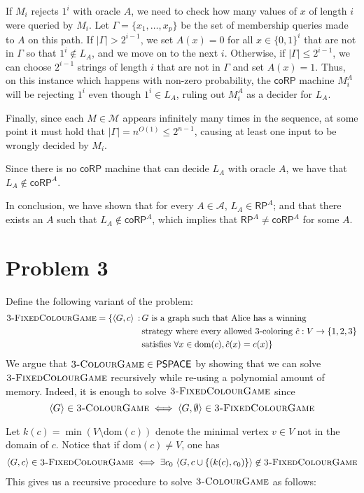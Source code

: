\documentclass{article}
\newcommand{\game}[0]{\textsc{3-ColourGame}}
\newcommand{\variantgame}[0]{\textsc{3-FixedColourGame}}
\newcommand{\PSPACE}[0]{\mathsf{PSPACE}}
\begin{document}
If $M_i$ rejects $1^i$ with oracle $A$, we need to check how many values of $x$ of length $i$ were queried by $M_i$. Let $\Gamma = \{x_1, \ldots, x_p\}$ be the set of membership queries made to $A$ on this path. If $|\Gamma| > 2^{i-1}$, we set $A(x) = 0$ for all $x \in \{0, 1\}^i$ that are not in $\Gamma$ so that $1^i \notin L_A$, and we move on to the next $i$. Otherwise, if $|\Gamma| \leq 2^{i-1}$, we can choose $2^{i-1}$ strings of length $i$ that are not in $\Gamma$ and set $A(x) = 1$. Thus, on this instance which happens with non-zero probability, the $\mathsf{coRP}$ machine $M_i^A$ will be rejecting $1^i$ even though $1^i \in L_A$, ruling out $M_i^A$ as a decider for $L_A$.

Finally, since each $M \in \mathcal{M}$ appears infinitely many times in the sequence, at some point it must hold that $|\Gamma| = n^{O(1)} \leq 2^{n-1}$, causing at least one input to be wrongly decided by $M_i$.

Since there is no $\mathsf{coRP}$ machine that can decide $L_A$ with oracle $A$, we have that $L_A \notin \mathsf{coRP}^A$.

In conclusion, we have shown that for every $A \in \mathcal{A}$, $L_A \in \mathsf{RP}^A$; and that there exists an $A$ such that $L_A \notin \mathsf{coRP}^A$, which implies that $\mathsf{RP}^A \neq \mathsf{coRP}^A$ for some $A$.

\section*{Problem 3}

Define the following variant of the problem:
\begin{align*}
	\variantgame = \{\langle G, c \rangle \,:\, & G \textrm{ is a graph such that Alice has a winning}                          \\
	                                            & \textrm{strategy where every allowed 3-coloring } \hat{c} : V \to \{1, 2, 3\} \\ & \textrm{satisfies } \forall x \in \textrm{dom}(c), \hat{c}(x) = c(x) \}
\end{align*}
We argue that $\game \in \PSPACE$ by showing that we can solve $\variantgame$ recursively while re-using a polynomial amount of memory. Indeed, it is enough to solve $\variantgame$ since
\[
	\langle G \rangle \in \game \iff \langle G, \emptyset \rangle \in \variantgame
\]

Let $k(c) = \min(V \setminus \textrm{dom}(c))$ denote the minimal vertex $v \in V$ not in the domain of $c$. Notice that if $\textrm{dom}(c) \neq V$, one has
\begin{align*}
	\langle G, c \rangle \in \variantgame \iff \exists c_0\, \left\langle G, c \cup \{(k(c), c_0)\} \right\rangle \not\in \variantgame
\end{align*}
This gives us a recursive procedure to solve $\game$ as follows:
\end{document}
